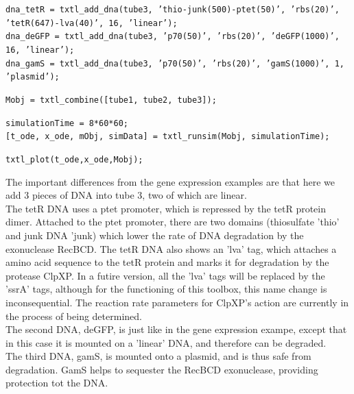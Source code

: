 \documentclass[english]{report}
\begin{document}
								\noindent \texttt{dna\_tetR = txtl\_add\_dna(tube3, 'thio-junk(500)-ptet(50)', 'rbs(20)', 'tetR(647)-lva(40)', 16, 'linear'); }\\
								\texttt{dna\_deGFP = txtl\_add\_dna(tube3, 'p70(50)', 'rbs(20)', 'deGFP(1000)', 16, 'linear');}\\
								\texttt{dna\_gamS = txtl\_add\_dna(tube3, 'p70(50)', 'rbs(20)', 'gamS(1000)', 1, 'plasmid');}
								\vspace*{1\baselineskip}
								
								\noindent \texttt{Mobj = txtl\_combine([tube1, tube2, tube3]);} 
								\vspace*{1\baselineskip}	
								
								\texttt{simulationTime =  8*60*60;}\\
								\texttt{[t\_ode, x\_ode, mObj, simData] = txtl\_runsim(Mobj, simulationTime);}
								\vspace*{1\baselineskip}
								
									 \begin{flushleft}
						 \texttt{\noindent txtl\_plot(t\_ode,x\_ode,Mobj); \\} 
						 \end{flushleft}
		
		The important differences from the gene expression examples are that here we add 3 pieces of DNA into tube 3, two of which are linear. \\
		The tetR DNA uses a ptet promoter, which is repressed by the tetR protein dimer. Attached to the ptet promoter, there are two domains (thiosulfate 'thio' and junk DNA 'junk) which lower the rate of DNA degradation by the exonuclease RecBCD. The tetR DNA also shows an 'lva' tag, which attaches a amino acid sequence to the tetR protein and marks it for degradation by the protease ClpXP. In a futire version, all the 'lva' tags will be replaced by the 'ssrA' tags, although for the functioning of this toolbox, this name change is inconsequential. The reaction rate parameters for ClpXP's action are currently in the process of being determined. \\
		The second DNA, deGFP, is just like in the gene expression exampe, except that in this case it is mounted on a 'linear' DNA, and therefore can be degraded. \\ 
		The third DNA, gamS, is mounted onto a plasmid, and is thus safe from degradation. GamS helps to sequester the RecBCD exonuclease, providing protection tot the DNA. \\
		
\end{document}
